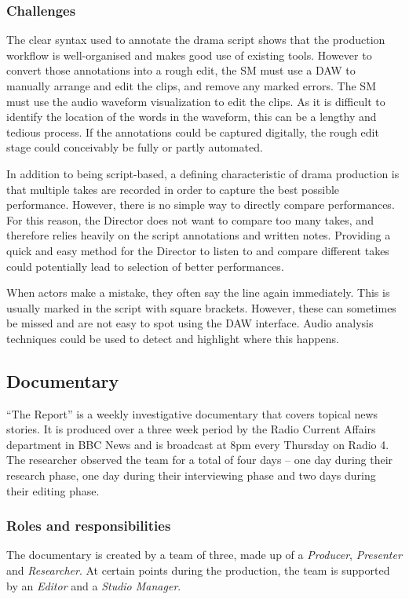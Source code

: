\subsubsection{Challenges}
The clear syntax used to annotate the drama script shows that the production workflow is well-organised and makes good
use of existing tools. However to convert those annotations into a rough edit, the SM must use a DAW to manually
arrange and edit the clips, and remove any marked errors. The SM must use the audio waveform visualization to edit the
clips.  As it is difficult to identify the location of the words in the waveform, this can be a lengthy and tedious
process. If the annotations could be captured digitally, the rough edit stage could conceivably be fully or partly
automated.

In addition to being script-based, a defining characteristic of drama production is that multiple takes are recorded in
order to capture the best possible performance. However, there is no simple way to directly compare performances. For
this reason, the Director does not want to compare too many takes, and therefore relies heavily on the script
annotations and written notes. Providing a quick and easy method for the Director to listen to and compare different
takes could potentially lead to selection of better performances.

When actors make a mistake, they often say the line again immediately. This is usually marked in the script with square
brackets. However, these can sometimes be missed and are not easy to spot using the DAW interface.  Audio analysis
techniques could be used to detect and highlight where this happens.


\subsection{Documentary}\label{sec:doc}
``The Report'' is a weekly investigative documentary that covers topical news stories. It is produced over a three week
period by the Radio Current Affairs department in BBC News and is broadcast at 8pm every Thursday on Radio 4. The
researcher observed the team for a total of four days -- one day during their research phase, one day during their
interviewing phase and two days during their editing phase.

\subsubsection{Roles and responsibilities}
The documentary is created by a team of three, made up of a \textit{Producer}, \textit{Presenter} and
\textit{Researcher}.  At certain points during the production, the team is supported by an \textit{Editor} and
a \textit{Studio Manager}.

